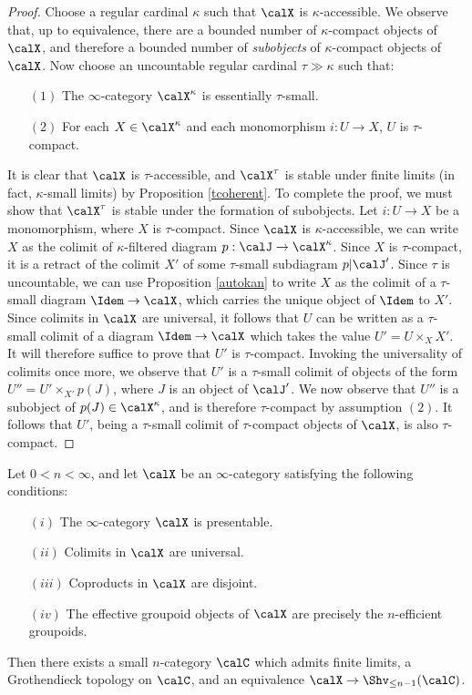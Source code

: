 \begin{proof}
Choose a regular cardinal $\kappa$ such that $\calX$ is $\kappa$-accessible. We observe that, up to equivalence, there are a bounded number of $\kappa$-compact objects of $\calX$, and therefore a bounded number of {\em subobjects} of $\kappa$-compact objects of $\calX$. Now choose an uncountable regular cardinal $\tau \gg \kappa$ such that:
\begin{itemize}
\item[$(1)$] The $\infty$-category $\calX^{\kappa}$ is essentially $\tau$-small.
\item[$(2)$] For each $X \in \calX^{\kappa}$ and each monomorphism $i: U \rightarrow X$, $U$ is $\tau$-compact.
\end{itemize}
It is clear that $\calX$ is $\tau$-accessible, and $\calX^{\tau}$ is stable under finite limits (in fact, $\kappa$-small limits) by Proposition \ref{tcoherent}. To complete the proof, we must show that $\calX^{\tau}$ is stable under the formation of subobjects. Let $i: U \rightarrow X$ be a monomorphism, where $X$ is $\tau$-compact. Since $\calX$ is $\kappa$-accessible, we can write
$X$ as the colimit of $\kappa$-filtered diagram $p: \calJ \rightarrow \calX^{\kappa}$. Since $X$ is $\tau$-compact, it is a retract of the colimit $X'$ of some $\tau$-small subdiagram $p| \calJ'$.
Since $\tau$ is uncountable, we can use Proposition \ref{autokan} to write
$X$ as the colimit of a $\tau$-small diagram $\Idem \rightarrow \calX$, which carries
the unique object of $\Idem$ to $X'$. Since colimits in $\calX$ are universal, it follows that
$U$ can be written as a $\tau$-small colimit of a diagram $\Idem \rightarrow \calX$ which takes the value $U' = U \times_{X} X'$. It will therefore suffice to prove that $U'$ is $\tau$-compact.
Invoking the universality of colimits once more, we observe that $U'$ is a $\tau$-small colimit of objects of the form $U'' = U' \times_{X'} p(J)$, where $J$ is an object of $\calJ'$. We now observe
that $U''$ is a subobject of $p(J) \in \calX^{\kappa}$, and is therefore $\tau$-compact by assumption $(2)$. It follows that $U'$, being a $\tau$-small colimit of $\tau$-compact objects of $\calX$, is also $\tau$-compact.
\end{proof}

\begin{proposition}\label{diamondstep}
Let $0 < n < \infty$, and let $\calX$ be an $\infty$-category satisfying the following conditions:
\begin{itemize}
\item[$(i)$] The $\infty$-category $\calX$ is presentable.
\item[$(ii)$] Colimits in $\calX$ are universal.
\item[$(iii)$] Coproducts in $\calX$ are disjoint.
\item[$(iv)$] The effective groupoid objects of $\calX$ are precisely the $n$-efficient groupoids.
\end{itemize}
Then there exists a small $n$-category $\calC$ which admits finite limits, a Grothendieck topology on $\calC$, and an equivalence $\calX \rightarrow \Shv_{\leq n-1}(\calC)$.
\end{proposition}

